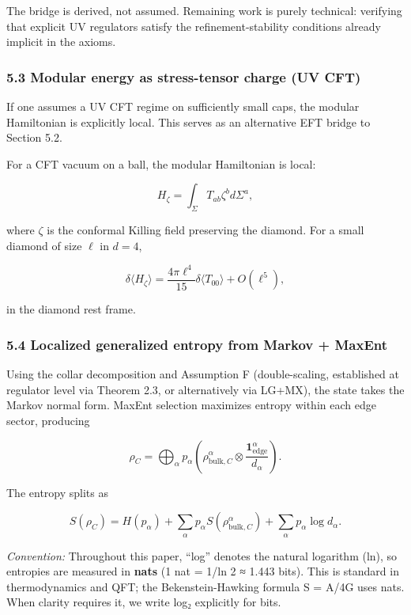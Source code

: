 \documentclass[
]{article}
\begin{document}
The bridge is derived, not assumed. Remaining work is purely technical:
verifying that explicit UV regulators satisfy the refinement-stability
conditions already implicit in the axioms.

\subsubsection{5.3 Modular energy as stress-tensor charge (UV
CFT)}\label{modular-energy-as-stress-tensor-charge-uv-cft}

If one assumes a UV CFT regime on sufficiently small caps, the modular
Hamiltonian is explicitly local. This serves as an alternative EFT
bridge to Section 5.2.

For a CFT vacuum on a ball, the modular Hamiltonian is local:

\[
H_{\zeta} = \int_{\Sigma} T_{ab} \zeta^b d\Sigma^a,
\]

where \(\zeta\) is the conformal Killing field preserving the diamond.
For a small diamond of size \(\ell\) in \(d=4\),

\[
\delta \langle H_{\zeta} \rangle = \frac{4 \pi \ell^4}{15} \delta \langle T_{00} \rangle + O(\ell^5),
\]

in the diamond rest frame.

\subsubsection{5.4 Localized generalized entropy from Markov +
MaxEnt}\label{localized-generalized-entropy-from-markov-maxent}

Using the collar decomposition and Assumption F (double-scaling,
established at regulator level via Theorem 2.3, or alternatively via
LG+MX), the state takes the Markov normal form. MaxEnt selection
maximizes entropy within each edge sector, producing

\[
\rho_C = \bigoplus_{\alpha} p_{\alpha}
\left(\rho_{\mathrm{bulk},C}^{\alpha} \otimes \frac{\mathbf 1_{\mathrm{edge}}^{\alpha}}{d_{\alpha}}\right).
\]

The entropy splits as

\[
S(\rho_C) = H(p_{\alpha}) + \sum_{\alpha} p_{\alpha} S(\rho_{\mathrm{bulk},C}^{\alpha}) + \sum_{\alpha} p_{\alpha} \log d_{\alpha}.
\]

\emph{Convention:} Throughout this paper, ``log'' denotes the natural
logarithm (ln), so entropies are measured in \textbf{nats} (1 nat = 1/ln
2 ≈ 1.443 bits). This is standard in thermodynamics and QFT; the
Bekenstein-Hawking formula S = A/4G uses nats. When clarity requires it,
we write log₂ explicitly for bits.
\end{document}
